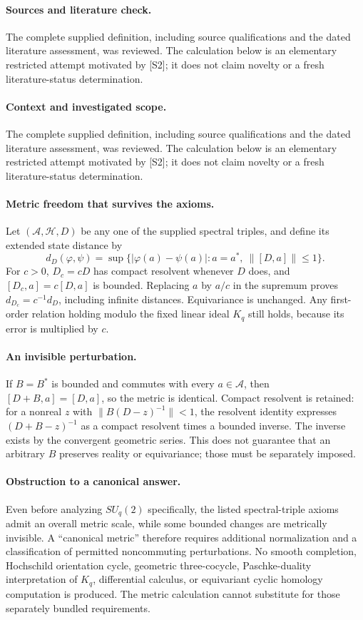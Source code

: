 \documentclass[11pt]{article}
\begin{document}
\paragraph{Sources and literature check.}
The complete supplied definition, including source qualifications and the dated literature assessment, was reviewed. The calculation below is an elementary restricted attempt motivated by [S2]; it does not claim novelty or a fresh literature-status determination.

\paragraph{Context and investigated scope.} The complete supplied definition, including source qualifications and the dated literature assessment, was reviewed. The calculation below is an elementary restricted attempt motivated by [S2]; it does not claim novelty or a fresh literature-status determination.

\paragraph{Metric freedom that survives the axioms.} Let $(\mathcal A,\mathcal H,D)$ be any one of the supplied spectral triples, and define its extended state distance by
\[
 d_D(\varphi,\psi)=\sup\{|\varphi(a)-\psi(a)|:a=a^*,\ \|[D,a]\|\leq1\}.
\]
For $c>0$, $D_c=cD$ has compact resolvent whenever $D$ does, and $[D_c,a]=c[D,a]$ is bounded. Replacing $a$ by $a/c$ in the supremum proves $d_{D_c}=c^{-1}d_D$, including infinite distances. Equivariance is unchanged. Any first-order relation holding modulo the fixed linear ideal $K_q$ still holds, because its error is multiplied by $c$.

\paragraph{An invisible perturbation.} If $B=B^*$ is bounded and commutes with every $a\in\mathcal A$, then $[D+B,a]=[D,a]$, so the metric is identical. Compact resolvent is retained: for a nonreal $z$ with $\|B(D-z)^{-1}\|<1$, the resolvent identity expresses $(D+B-z)^{-1}$ as a compact resolvent times a bounded inverse. The inverse exists by the convergent geometric series. This does not guarantee that an arbitrary $B$ preserves reality or equivariance; those must be separately imposed.

\paragraph{Obstruction to a canonical answer.} Even before analyzing $SU_q(2)$ specifically, the listed spectral-triple axioms admit an overall metric scale, while some bounded changes are metrically invisible. A ``canonical metric'' therefore requires additional normalization and a classification of permitted noncommuting perturbations. No smooth completion, Hochschild orientation cycle, geometric three-cocycle, Paschke-duality interpretation of $K_q$, differential calculus, or equivariant cyclic homology computation is produced. The metric calculation cannot substitute for those separately bundled requirements.
\end{document}
